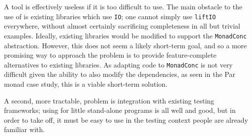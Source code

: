 A tool is effectively useless if it is too difficult to use. The main
obstacle to the use of \dejafu{} is existing libraries which use
\verb|IO|; one cannot simply use \verb|liftIO| everywhere, without
almost certainly sacrificing completeness in all but trivial
examples. Ideally, existing libraries would be modified to support the
\verb|MonadConc| abstraction. However, this does not seem a likely
short-term goal, and so a more promising way to approach the problem
is to provide feature-complete alternatives to existing libraries. As
adapting code to \verb|MonadConc| is not very difficult given the
ability to also modify the dependencies, as seen in the Par monad case
study, this is a viable short-term solution.


\FloatBarrier

A second, more tractable, problem is integration with existing testing
frameworks; using \dejafu{} for little stand-alone programs is all
well and good, but in order to take off, it must be easy to use in the
testing context people are already familiar with.
